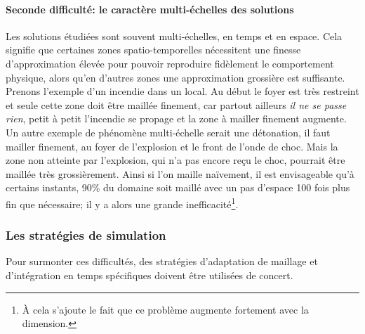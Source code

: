     \paragraph{Seconde difficulté: le caractère multi-échelles des solutions}
        Les solutions étudiées sont souvent multi-échelles, en temps et en espace. Cela signifie que certaines zones spatio-temporelles nécessitent
        une finesse d'approximation élevée pour pouvoir reproduire fidèlement le comportement physique, alors qu'en d'autres zones une approximation
        grossière est suffisante. Prenons l'exemple d'un incendie dans un local. Au début le foyer est très restreint et seule cette zone doit être maillée finement, 
        car partout ailleurs \textit{il ne se passe rien}, petit à petit l'incendie se propage et la zone à mailler finement augmente. Un autre exemple de phénomène 
        multi-échelle serait une détonation, il faut mailler finement, au foyer de l'explosion et le front de l'onde de choc. Mais la zone non atteinte par l'explosion, 
        qui n'a pas encore reçu le choc, pourrait être maillée très grossièrement. 
        Ainsi si l'on maille naïvement, il est envisageable qu'à certains instants, 90\% du domaine soit maillé avec un pas d'espace 100 fois plus fin que nécessaire;
        il y a alors une grande inefficacité\footnote{À cela s'ajoute le fait que ce problème augmente fortement avec la dimension.}.


\subsubsection{Les stratégies de simulation}
    Pour surmonter ces difficultés, des stratégies d'adaptation de maillage et d'intégration en temps spécifiques doivent être utilisées de concert. 
